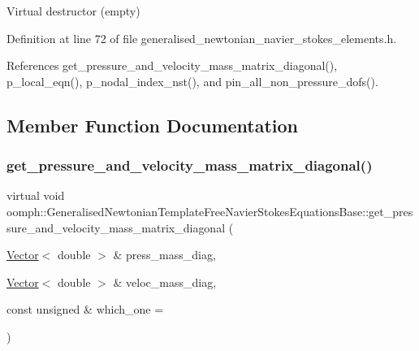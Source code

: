 Virtual destructor (empty) 



Definition at line 72 of file generalised\+\_\+newtonian\+\_\+navier\+\_\+stokes\+\_\+elements.\+h.



References get\+\_\+pressure\+\_\+and\+\_\+velocity\+\_\+mass\+\_\+matrix\+\_\+diagonal(), p\+\_\+local\+\_\+eqn(), p\+\_\+nodal\+\_\+index\+\_\+nst(), and pin\+\_\+all\+\_\+non\+\_\+pressure\+\_\+dofs().



\subsection{Member Function Documentation}
\mbox{\label{classoomph_1_1GeneralisedNewtonianTemplateFreeNavierStokesEquationsBase_a04ab7221559a058af6f0266197094320}} 
\subsubsection{\texorpdfstring{get\+\_\+pressure\+\_\+and\+\_\+velocity\+\_\+mass\+\_\+matrix\+\_\+diagonal()}{get\_pressure\_and\_velocity\_mass\_matrix\_diagonal()}}
{\footnotesize\ttfamily virtual void oomph\+::\+Generalised\+Newtonian\+Template\+Free\+Navier\+Stokes\+Equations\+Base\+::get\+\_\+pressure\+\_\+and\+\_\+velocity\+\_\+mass\+\_\+matrix\+\_\+diagonal (\begin{DoxyParamCaption}\item[{\hyperlink{classoomph_1_1Vector}{Vector}$<$ double $>$ \&}]{press\+\_\+mass\+\_\+diag,  }\item[{\hyperlink{classoomph_1_1Vector}{Vector}$<$ double $>$ \&}]{veloc\+\_\+mass\+\_\+diag,  }\item[{const unsigned \&}]{which\+\_\+one = {} }\end{DoxyParamCaption})\hspace{0.3cm}{\ttfamily [pure virtual]}}



